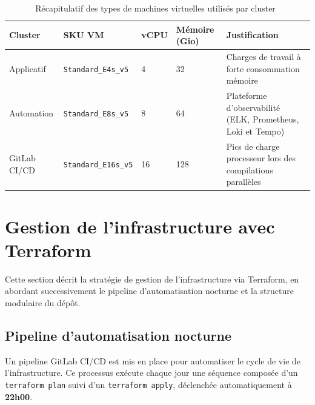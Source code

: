 \begin{table}[htbp]
  \centering
  \renewcommand{\arraystretch}{1.3}
  \begin{tabularx}{\textwidth}{L{3cm} C{3cm} C{2.5cm} C{2.5cm} L{2.5cm}}
    \toprule
    \textbf{Cluster} & \textbf{SKU VM} & \textbf{vCPU} & \textbf{Mémoire (Gio)} & \textbf{Justification} \\
    \midrule
    Applicatif     & \texttt{Standard\_E4s\_v5}  & 4   & 32  & Charges de travail à forte consommation mémoire \\
    Automation & \texttt{Standard\_E8s\_v5}  & 8   & 64  & Plateforme d'observabilité (ELK, Prometheus, Loki et Tempo) \\
    GitLab CI/CD   & \texttt{Standard\_E16s\_v5} & 16  & 128 & Pics de charge processeur lors des compilations parallèles \\
    \bottomrule
  \end{tabularx}
  \caption{Récapitulatif des types de machines virtuelles utilisés par cluster~\cite{azure2023vm}}
   \label{tab:vm_types}
\end{table}

\section{Gestion de l'infrastructure avec Terraform}
\label{sec:terraform_pipeline}

\noindent Cette section décrit la stratégie de gestion de l'infrastructure via Terraform, en abordant successivement le pipeline d'automatisation nocturne et la structure modulaire du dépôt.

\subsection{Pipeline d'automatisation nocturne}

Un pipeline GitLab \ac{CI/CD} est mis en place pour automatiser le cycle de vie de l'infrastructure. Ce processus exécute chaque jour une séquence composée d'un \texttt{terraform plan} suivi d'un \texttt{terraform apply}, déclenchée automatiquement à \textbf{22h00}.

